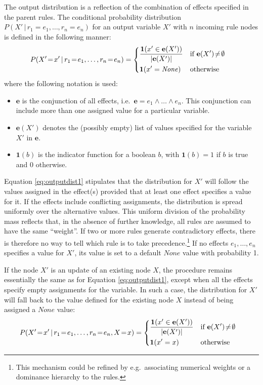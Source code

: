 The output distribution is a reflection of the combination of effects specified in the parent rules. The conditional probability distribution $P(X' \, | \, r_1\!=\!e_1, \dots, r_n\!=\!e_n)$ for an output variable $X'$ with $n$ incoming rule nodes is defined in the following manner:
\begin{align}
&P(X'\!=\!x' \, | \, r_1\!=\!e_1, \dots, r_n\!=\!e_n) = \begin{dcases}
\frac{\mathbf{1}(x' \in {\mathbf{e}(X')})} { |\mathbf{e}(X')| } & \text{if } \mathbf{e}(X')\!\neq\!\emptyset \\
\mathbf{1}(x' = \mathit{None}) & \text{otherwise}
\end{dcases}
\label{eq:outputdist1}
\end{align}
where the following notation is used: \begin{itemize}
\item $\mathbf{e}$ is the conjunction of all effects, i.e.\ $\mathbf{e} = e_1 \land \dots \land e_n$.  This conjunction can include more than one assigned value for a particular variable.
\item $\mathbf{e}(X')$ denotes the (possibly empty) list of values specified for the variable $X'$ in $\mathbf{e}$. 
\item $\mathbf{1}(b)$ is the indicator function for a boolean $b$, with $\mathbf{1}(b)=1$ if $b$ is true and $0$ otherwise.
\end{itemize}

Equation \eqref{eq:outputdist1} stipulates that the distribution for $X'$ will follow the values assigned in the effect(s) provided that at least one effect specifies a value for it. If the effects include conflicting assignments, the distribution is spread uniformly over the alternative values. This uniform division of the probability mass reflects that, in the absence of further knowledge, all rules are assumed to have the same ``weight''. If two or more rules generate contradictory effects, there is therefore no way to tell which rule is to take precedence.\footnote{This mechanism could be refined by e.g.\ associating numerical weights or a dominance hierarchy to the rules.} If no effects $e_1, \dots, e_n$ specifies a value for $X'$, its value is set to a default $\mathit{None}$ value with probability 1. 

If the node $X'$ is an update of an existing node $X$, the procedure remains essentially the same as for Equation \eqref{eq:outputdist1}, except when all the effects specify empty assignments for the variable. In such a case, the distribution for $X'$ will fall back to the value defined for the existing node $X$ instead of being assigned a $\mathit{None}$ value:
\begin{align}
&P(X'\!=\!x' \, | \, r_1\!=\!e_1, \dots, r_n\!=\!e_n, X\!=\!x) = \begin{dcases} 
\frac{\mathbf{1}(x' \in {\mathbf{e}(X')})} { |\mathbf{e}(X')| }  & \text{if } \mathbf{e}(X')\!\neq\!\emptyset \\
\mathbf{1}(x' = x) & \text{otherwise}
\end{dcases}\label{eq:outputdist2}
\end{align}

